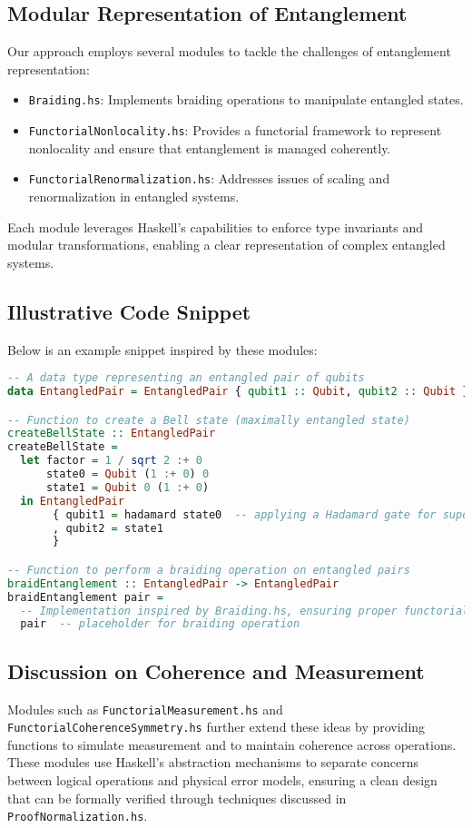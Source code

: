 \documentclass[12pt]{article}
\begin{document}
\subsection{Modular Representation of Entanglement}
Our approach employs several modules to tackle the challenges of entanglement representation:
\begin{itemize}
    \item \texttt{Braiding.hs}: Implements braiding operations to manipulate entangled states.
    \item \texttt{FunctorialNonlocality.hs}: Provides a functorial framework to represent nonlocality and ensure that entanglement is managed coherently.
    \item \texttt{FunctorialRenormalization.hs}: Addresses issues of scaling and renormalization in entangled systems.
\end{itemize}
Each module leverages Haskell’s capabilities to enforce type invariants and modular transformations, enabling a clear representation of complex entangled systems.

\subsection{Illustrative Code Snippet}
Below is an example snippet inspired by these modules:
\begin{lstlisting}[language=Haskell]
-- A data type representing an entangled pair of qubits
data EntangledPair = EntangledPair { qubit1 :: Qubit, qubit2 :: Qubit }

-- Function to create a Bell state (maximally entangled state)
createBellState :: EntangledPair
createBellState = 
  let factor = 1 / sqrt 2 :+ 0
      state0 = Qubit (1 :+ 0) 0
      state1 = Qubit 0 (1 :+ 0)
  in EntangledPair 
       { qubit1 = hadamard state0  -- applying a Hadamard gate for superposition
       , qubit2 = state1
       }

-- Function to perform a braiding operation on entangled pairs
braidEntanglement :: EntangledPair -> EntangledPair
braidEntanglement pair = 
  -- Implementation inspired by Braiding.hs, ensuring proper functorial mapping
  pair  -- placeholder for braiding operation
\end{lstlisting}

\subsection{Discussion on Coherence and Measurement}
Modules such as \texttt{FunctorialMeasurement.hs} and \texttt{FunctorialCoherenceSymmetry.hs} further extend these ideas by providing functions to simulate measurement and to maintain coherence across operations. These modules use Haskell’s abstraction mechanisms to separate concerns between logical operations and physical error models, ensuring a clean design that can be formally verified through techniques discussed in \texttt{ProofNormalization.hs}.
\end{document}
